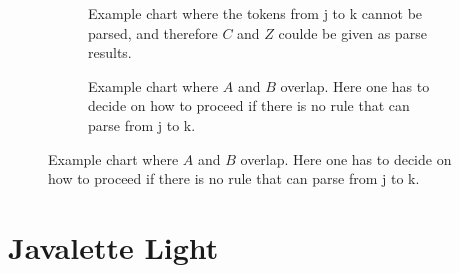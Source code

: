 \documentclass[a4paper,12pt,twosided]{report}
\newcommand{\subt}[3] { 
  \draw[grid] (#1,#1) -- (#1,#2) node[inChart] {#3} -- (#2,#2);
  \fill[color=black] (#1,#2) circle (2pt)
 }
\newcommand{\mrk}[2]{\node[inChart] at (#1,#1) {#2}}
\begin{document}
\begin{figure}[H]
  \centering
  \begin{subfigure}[H]{.4\textwidth}
    \flushleft
     \caption{\label{missingglue}Example chart where the tokens from j to k
     cannot be parsed, and therefore $C$ and $Z$ coulde be given as parse
     results.}
  \end{subfigure}
  \begin{subfigure}[H]{.1\textwidth}
  \text{}
  \end{subfigure}
  \begin{subfigure}[H]{.4\textwidth}
    \flushright
    \caption{\label{parseoverlap} Example chart where $A$ and $B$ overlap. Here one
    has to decide on how to proceed if there is no rule that can parse from j to
    k.}
  \end{subfigure}
\end{figure}

%
%




%
%

\appendix
\chapter{Javalette Light}
\end{document}
